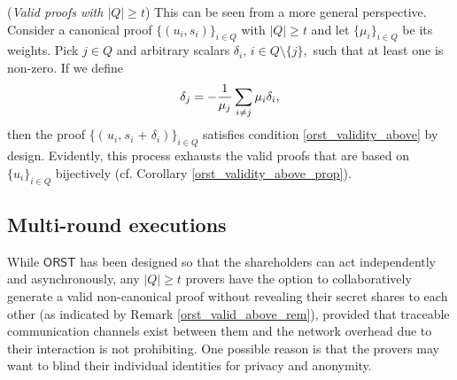 \documentclass{iacrtrans}
\begin{document}
\begin{rem}\label{orst_valid_above_rem}
(\textit{Valid proofs with $|Q| \ge t$})
This can be seen from a more general perspective.
Consider a canonical proof $\{(u_i, s_i)\}_{i \in Q}$
with $|Q| \ge t$ and let $\{\mu_i\}_{i \in Q}$ be its weights.
Pick $j \in Q$ and arbitrary scalars
$\delta_i,\hspace{2pt} i \in Q \setminus \{j\},$
such that at least one is non-zero.
If we define
\vspace{5pt}
\begin{equation*}
\delta_j = - \frac{1}{\mu_j}
\sum_{i \neq j} \mu_i \delta_i,
\vspace{5pt}
\end{equation*}
then the proof $
	\{
		(
			\hspace{1pt}
			u_i,
			\hspace{1pt}
			s_i
			\hspace{1pt}
			+
			\hspace{1pt}
			\delta_i
		)
	\}_{i \in Q}$
satisfies condition \eqref{orst_validity_above}
by design. Evidently, this process exhausts the valid proofs
that are based on $\{u_i\}_{i \in Q}$ bijectively
(cf. Corollary \ref{orst_validity_above_prop}).
\end{rem}

\subsection{Multi-round executions}\label{section_multi_round}

While $\mathsf{ORST}$ has been designed so that
the shareholders can act independently and asynchronously,
any $|Q| \ge t$ provers have the option to collaboratively
generate a valid non-canonical proof without
revealing their secret shares to each other
(as indicated by Remark \ref{orst_valid_above_rem}),
provided that traceable communication channels
exist between them and the network overhead
due to their interaction is not prohibiting.
One possible reason is that the provers
may want to blind their individual identities
for privacy and anonymity.
\end{document}
